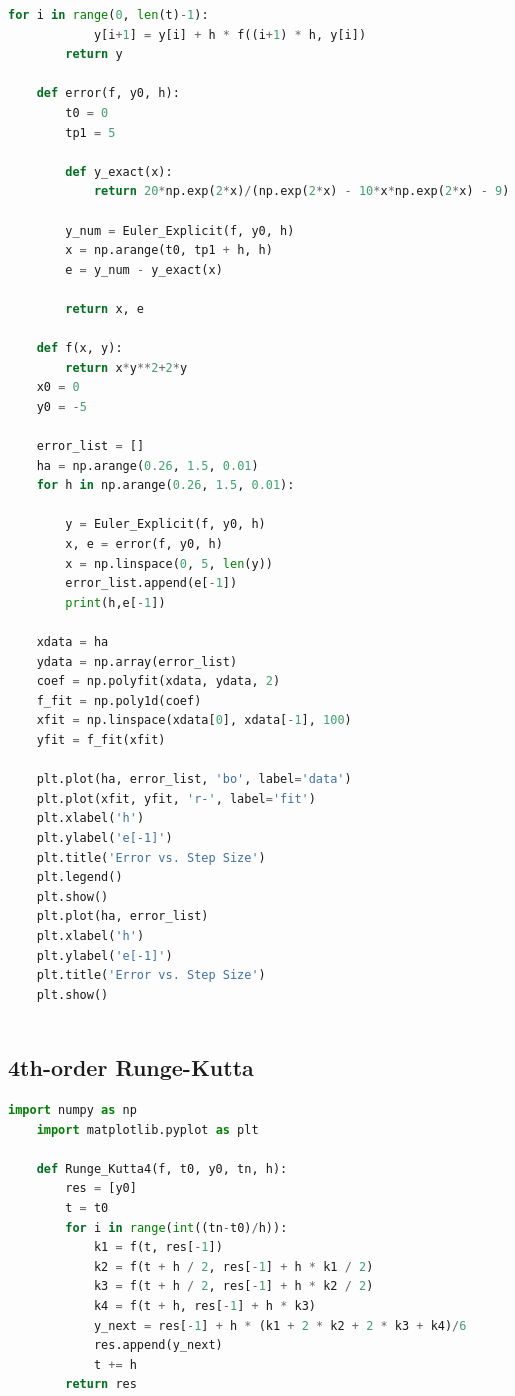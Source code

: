 \documentclass[12pt, a4paper, oneside]{ctexart}
\begin{document}
\begin{spacing}{2.0}
\begin{lstlisting}[language=Python, caption=显式欧拉法]
        for i in range(0, len(t)-1):
            y[i+1] = y[i] + h * f((i+1) * h, y[i])
        return y
    
    def error(f, y0, h):
        t0 = 0
        tp1 = 5
        
        def y_exact(x):
            return 20*np.exp(2*x)/(np.exp(2*x) - 10*x*np.exp(2*x) - 9)
    
        y_num = Euler_Explicit(f, y0, h)
        x = np.arange(t0, tp1 + h, h)
        e = y_num - y_exact(x)
    
        return x, e
        
    def f(x, y):
        return x*y**2+2*y
    x0 = 0
    y0 = -5
    
    error_list = []
    ha = np.arange(0.26, 1.5, 0.01)
    for h in np.arange(0.26, 1.5, 0.01):
        
        y = Euler_Explicit(f, y0, h)
        x, e = error(f, y0, h)
        x = np.linspace(0, 5, len(y))
        error_list.append(e[-1])
        print(h,e[-1])
    
    xdata = ha
    ydata = np.array(error_list)
    coef = np.polyfit(xdata, ydata, 2)
    f_fit = np.poly1d(coef)
    xfit = np.linspace(xdata[0], xdata[-1], 100)
    yfit = f_fit(xfit)
        
    plt.plot(ha, error_list, 'bo', label='data')
    plt.plot(xfit, yfit, 'r-', label='fit')
    plt.xlabel('h')
    plt.ylabel('e[-1]')
    plt.title('Error vs. Step Size')
    plt.legend()
    plt.show()
    plt.plot(ha, error_list)
    plt.xlabel('h')
    plt.ylabel('e[-1]')
    plt.title('Error vs. Step Size')
    plt.show()
    
\end{lstlisting}
\subsection{4th-order Runge-Kutta}
\begin{lstlisting}[language=Python, caption=4th-order Runge-Kutta]
    import numpy as np
    import matplotlib.pyplot as plt
    
    def Runge_Kutta4(f, t0, y0, tn, h):
        res = [y0]
        t = t0
        for i in range(int((tn-t0)/h)):
            k1 = f(t, res[-1])
            k2 = f(t + h / 2, res[-1] + h * k1 / 2)
            k3 = f(t + h / 2, res[-1] + h * k2 / 2)
            k4 = f(t + h, res[-1] + h * k3)
            y_next = res[-1] + h * (k1 + 2 * k2 + 2 * k3 + k4)/6
            res.append(y_next)
            t += h
        return res
    

\end{lstlisting}
\end{spacing}
\end{document}
